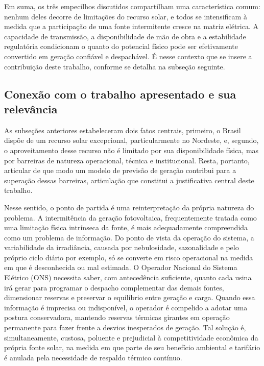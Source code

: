 Em suma, os três empecilhos discutidos compartilham uma característica comum:
nenhum deles decorre de limitações do recurso solar, e todos se intensificam à
medida que a participação de uma fonte intermitente cresce na matriz elétrica.
A capacidade de transmissão, a disponibilidade de mão de obra e a estabilidade
regulatória condicionam o quanto do potencial físico pode ser efetivamente
convertido em geração confiável e despachável. É nesse contexto que se insere a
contribuição deste trabalho, conforme se detalha na subseção seguinte.

\subsection{Conexão com o trabalho apresentado e sua relevância}
\label{subsec:relevancia}

As subseções anteriores estabeleceram dois fatos centrais, primeiro, o Brasil dispõe de um
recurso solar excepcional, particularmente no Nordeste, e, segundo, o aproveitamento desse
recurso não é limitado por sua disponibilidade física, mas por barreiras de
natureza operacional, técnica e institucional. Resta, portanto, articular de que
modo um modelo de previsão de geração contribui para a superação dessas barreiras, 
articulação que constitui a justificativa central deste trabalho.

Nesse sentido, o ponto de partida é uma reinterpretação da própria natureza do problema. A
intermitência da geração fotovoltaica, frequentemente tratada como uma limitação
física intrínseca da fonte, é mais adequadamente compreendida como um problema de
informação. Do ponto de vista da operação do sistema, a variabilidade da
irradiância, causada por nebulosidade, sazonalidade e pelo próprio ciclo diário por exemplo, 
só se converte em risco operacional na medida em que é desconhecida ou mal
estimada. O Operador Nacional do Sistema Elétrico (ONS) necessita
saber, com antecedência suficiente, quanto cada usina irá gerar para programar o
despacho complementar das demais fontes, dimensionar reservas e preservar o
equilíbrio entre geração e carga. Quando essa informação é imprecisa ou
indisponível, o operador é compelido a adotar uma postura conservadora, mantendo
reservas térmicas girantes em operação permanente para fazer frente a desvios
inesperados de geração. Tal solução é, simultaneamente, custosa, poluente e
prejudicial à competitividade econômica da própria fonte solar, na medida em que
parte de seu benefício ambiental e tarifário é anulada pela necessidade de
respaldo térmico contínuo.

